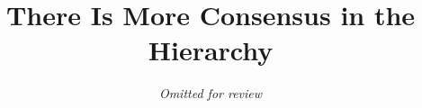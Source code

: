 \documentclass[letterpaper,10pt,twocolumn]{article}
\begin{document}
\date{}

\title{\Large \bf There Is More Consensus in the Hierarchy }


\author{\emph{Omitted for review}}

\maketitle

\thispagestyle{empty}
\end{document}
